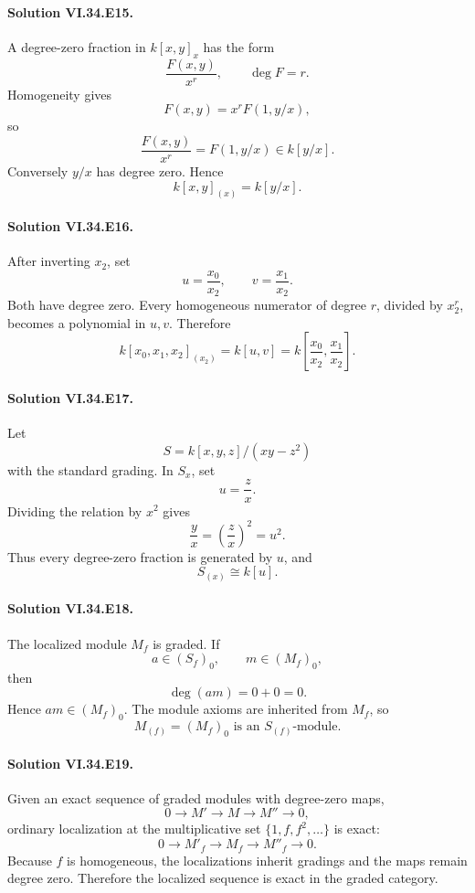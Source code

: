 \paragraph{Solution VI.34.E15.}
A degree-zero fraction in \(k[x,y]_x\) has the form
\[
\frac{F(x,y)}{x^r},
\qquad
\deg F=r.
\]
Homogeneity gives
\[
F(x,y)=x^rF(1,y/x),
\]
so
\[
\frac{F(x,y)}{x^r}=F(1,y/x)\in k[y/x].
\]
Conversely \(y/x\) has degree zero. Hence
\[
\boxed{k[x,y]_{(x)}=k[y/x]}.
\]

\paragraph{Solution VI.34.E16.}
After inverting \(x_2\), set
\[
u=\frac{x_0}{x_2},
\qquad
v=\frac{x_1}{x_2}.
\]
Both have degree zero. Every homogeneous numerator of degree \(r\), divided by \(x_2^r\), becomes a polynomial in
\(u,v\). Therefore
\[
\boxed{
k[x_0,x_1,x_2]_{(x_2)}
=
k[u,v]
=
k\!\left[\frac{x_0}{x_2},\frac{x_1}{x_2}\right].
}
\]

\paragraph{Solution VI.34.E17.}
Let
\[
S=k[x,y,z]/(xy-z^2)
\]
with the standard grading. In \(S_x\), set
\[
u=\frac zx.
\]
Dividing the relation by \(x^2\) gives
\[
\frac yx=\left(\frac zx\right)^2=u^2.
\]
Thus every degree-zero fraction is generated by \(u\), and
\[
\boxed{S_{(x)}\cong k[u]}.
\]

\paragraph{Solution VI.34.E18.}
The localized module \(M_f\) is graded. If
\[
a\in(S_f)_0,\qquad m\in(M_f)_0,
\]
then
\[
\deg(am)=0+0=0.
\]
Hence \(am\in(M_f)_0\). The module axioms are inherited from \(M_f\), so
\[
\boxed{M_{(f)}=(M_f)_0\text{ is an }S_{(f)}\text{-module}}.
\]

\paragraph{Solution VI.34.E19.}
Given an exact sequence of graded modules with degree-zero maps,
\[
0\to M'\to M\to M''\to0,
\]
ordinary localization at the multiplicative set \(\{1,f,f^2,\ldots\}\) is exact:
\[
0\to M'_f\to M_f\to M''_f\to0.
\]
Because \(f\) is homogeneous, the localizations inherit gradings and the maps remain degree zero. Therefore the
localized sequence is exact in the graded category.

